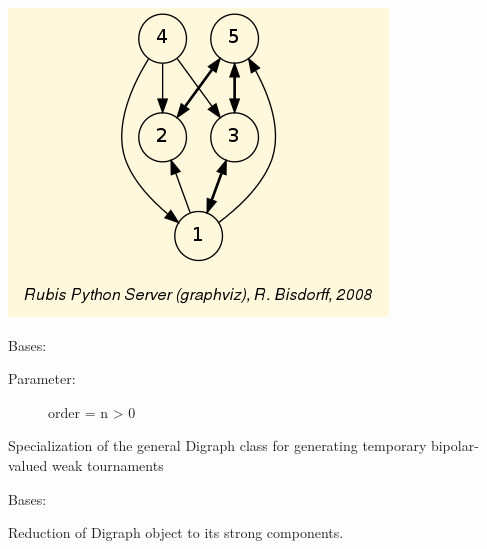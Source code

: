 \documentclass[letterpaper,10pt,english]{sphinxmanual}
\begin{document}
\begin{fulllineitems}
\includegraphics{randomValuationDigraph.png}

\end{fulllineitems}


\begin{fulllineitems}
\label{techDoc:digraphs.RandomWeakTournament}
Bases: {\hyperref[techDoc:digraphs.Digraph]{}}
\begin{description}
\item[{Parameter:}] \leavevmode
order = n \textgreater{} 0

\end{description}

Specialization of the general Digraph class for generating
temporary bipolar-valued weak tournaments

\end{fulllineitems}


\begin{fulllineitems}
\label{techDoc:digraphs.StrongComponentsCollapsedDigraph}
Bases: {\hyperref[techDoc:digraphs.Digraph]{}}

Reduction of Digraph object to its strong components.

\begin{fulllineitems}
\label{techDoc:digraphs.StrongComponentsCollapsedDigraph.showComponents}
\end{fulllineitems}


\end{fulllineitems}
\end{document}
